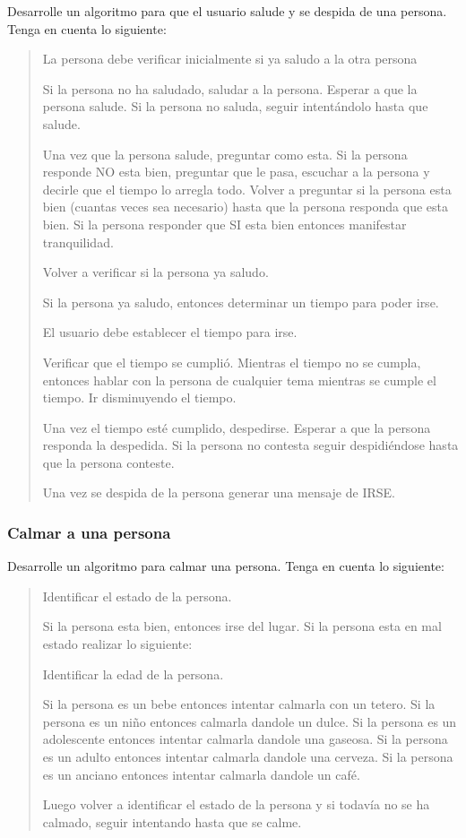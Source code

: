 \documentclass[letterpaper,10pt,spanish]{sphinxmanual}
\begin{document}
\sphinxAtStartPar
Desarrolle un algoritmo para que el usuario salude y se despida de una persona. Tenga en cuenta lo siguiente:
\begin{quote}

\sphinxAtStartPar
La persona debe verificar inicialmente si ya saludo a la otra persona

\sphinxAtStartPar
Si la persona no ha saludado, saludar a la persona. Esperar a que la persona salude. Si la persona no saluda, seguir intentándolo hasta que salude.

\sphinxAtStartPar
Una vez que la persona salude, preguntar como esta. Si la persona responde NO esta bien, preguntar que le pasa, escuchar a la persona y decirle que el tiempo lo arregla todo. Volver a preguntar si la persona esta bien (cuantas veces sea necesario) hasta que la persona responda que esta bien.  Si la persona responder que SI esta bien entonces manifestar tranquilidad.

\sphinxAtStartPar
Volver a verificar si la persona ya saludo.

\sphinxAtStartPar
Si la persona ya saludo, entonces determinar un tiempo para poder irse.

\sphinxAtStartPar
El usuario debe establecer el tiempo para irse.

\sphinxAtStartPar
Verificar que el tiempo se cumplió. Mientras el tiempo no se cumpla, entonces hablar con la persona de cualquier tema mientras se cumple el tiempo. Ir disminuyendo el tiempo.

\sphinxAtStartPar
Una vez el tiempo esté cumplido, despedirse. Esperar a que la persona responda la despedida. Si la persona no contesta seguir despidiéndose hasta que la persona conteste.

\sphinxAtStartPar
Una vez se despida de la persona generar una mensaje de IRSE.
\end{quote}
\subsubsection*{Calmar a una persona}

\sphinxAtStartPar
Desarrolle un algoritmo para calmar una persona. Tenga en cuenta lo siguiente:
\begin{quote}

\sphinxAtStartPar
Identificar el estado de la persona.

\sphinxAtStartPar
Si la persona esta bien, entonces irse del lugar. Si la persona esta en mal estado realizar lo siguiente:

\sphinxAtStartPar
Identificar la edad de la persona.

\sphinxAtStartPar
Si la persona es un bebe entonces intentar calmarla con un tetero. Si la persona es un niño entonces calmarla dandole un dulce. Si la persona es un adolescente entonces intentar calmarla dandole una gaseosa. Si la persona es un adulto entonces intentar calmarla dandole una cerveza. Si la persona es un anciano entonces intentar calmarla dandole un café.

\sphinxAtStartPar
Luego volver a identificar el estado de la persona y si todavía no se ha calmado, seguir intentando hasta que se calme.
\end{quote}
\end{document}
